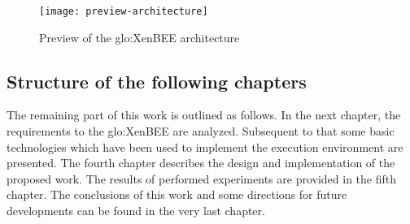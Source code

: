 \begin{figure}[ht]
  \centering
  \texttt{[image: preview-architecture]}
  \caption{Preview of the \gls{glo:XenBEE} architecture}
  \label{fig:preview-architecture}
\end{figure}

\subsection*{Structure of the following chapters}

The  remaining part  of this  work is  outlined as  follows.  In  the next
chapter, the requirements to the \gls{glo:XenBEE} are analyzed. Subsequent
to  that some basic  technologies which  have been  used to  implement the
execution  environment are  presented.  The  fourth chapter  describes the
design and implementation of the  proposed work.  The results of performed
experiments are  provided in the  fifth chapter.  The conclusions  of this
work and some directions for future  developments can be found in the very
last chapter.

